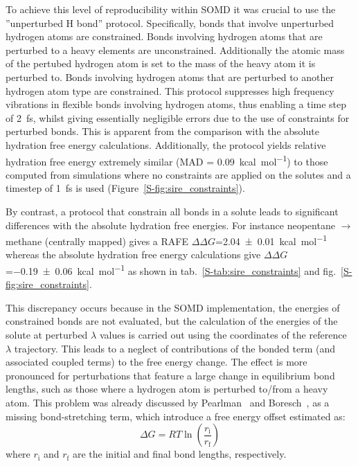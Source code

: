\documentclass[journal=jctcce,manuscript=article]{achemso}
\begin{document}
To achieve this level of reproducibility within SOMD it was crucial to use the
''unperturbed H bond'' protocol. Specifically, bonds that involve unperturbed hydrogen 
atoms are constrained. Bonds involving hydrogen atoms that are perturbed to a heavy elements
are unconstrained.
Additionally the atomic mass of the pertubed hydrogen atom is set to the mass of 
the heavy atom it is perturbed to.
Bonds involving hydrogen atoms that are perturbed to another hydrogen atom type are 
constrained. This protocol suppresses high frequency vibrations in flexible bonds 
involving hydrogen atoms, thus enabling a time step of \SI{2}{fs}, whilst 
giving 
essentially negligible errors due to the use of constraints for perturbed bonds. 
This is apparent from the comparison with the absolute hydration free energy calculations. 
Additionally, the protocol yields relative hydration free energy extremely similar
(MAD = \SI{0.09}{kcal.mol^{-1}}) to those computed from simulations where no
constraints are applied on the solutes and a timestep of \SI{1}{fs} is
used (Figure~\ref{S-fig:sire_constraints}).

By contrast, a protocol that constrain all bonds in a solute leads to significant
differences with the absolute hydration free energies. For instance 
neopentane $\rightarrow$ methane (centrally mapped) gives a RAFE
$\Delta\Delta G$=\SI{2.04 +- 0.01}{kcal.mol^{-1}}  whereas the absolute hydration free
energy calculations give $\Delta\Delta G$=\SI{-0.19+-0.06}{kcal.mol^{-1}} as shown in 
tab.~\ref{S-tab:sire_constraints} and fig.~\ref{S-fig:sire_constraints}.

This discrepancy occurs because in the SOMD implementation, the energies of 
constrained bonds are not evaluated, but the calculation of the energies of the 
solute at perturbed $\lambda$ values is carried out using the coordinates of 
the 
reference $\lambda$ trajectory. This leads to a neglect of contributions of the 
bonded
term (and associated coupled terms) to the free energy change. The effect 
is more pronounced for perturbations that feature a large change in 
equilibrium bond lengths, such as those where a hydrogen atom is perturbed to/from a heavy atom.
This problem was already discussed by Pearlman~\cite{pearlman1991overlooked} 
and Boresch~\cite{doi:10.1021/jp981628n, doi:10.1021/jp981629f}, as a missing 
bond-stretching term, which introduce a free energy offset estimated as:
\begin{equation}
 \label{eq:allbondserror}
 \Delta G= RT\ln \left ( \frac{r_{\mathrm{i}}}{r_\mathrm{f}} \right)  
\end{equation}
where $r_{\mathrm{i}}$ and $r_{\mathrm{f}}$ are the initial and final bond 
lengths, respectively. 
\end{document}
